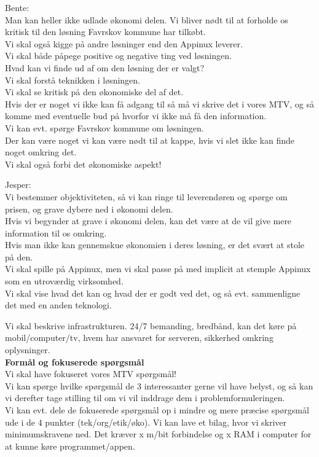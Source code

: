 Bente: \\ Man kan heller ikke udlade økonomi delen. Vi bliver nødt til at forholde os kritisk til den løsning Favrskov kommune har tilkøbt. \\ 
Vi skal også kigge på andre løsninger end den Appinux leverer.\\
Vi skal både påpege positive og negative ting ved løsningen.\\
Hvad kan vi finde ud af om den løsning der er valgt? \\
Vi skal forstå teknikken i løsningen. \\
Vi skal se kritisk på den økonomiske del af det. \\
Hvis der er noget vi ikke kan få adgang til så må vi skrive det i vores MTV, og så komme med eventuelle bud på hvorfor vi ikke må få den information.\\
Vi kan evt. spørge Favrskov kommune om løsningen.\\
Der kan være noget vi kan være nødt til at kappe, hvis vi slet ikke kan finde noget omkring det.\\
Vi skal også forbi det økonomiske aspekt!

Jesper: \\ Vi bestemmer objektiviteten, så vi kan ringe til leverendøren og spørge om prisen, og grave dybere ned i økonomi delen.\\
Hvis vi begynder at grave i økonomi delen, kan det være at de vil give mere information til os omkring.\\
Hvis man ikke kan gennemskue økonomien i deres løsning, er det svært at stole på den. \\
Vi skal spille på Appinux, men vi skal passe på med implicit at stemple Appinux som en utroværdig virksomhed. \\
Vi skal vise hvad det kan og hvad der er godt ved det, og så evt. sammenligne det med en anden teknologi.

Vi skal beskrive infrastrukturen. 24/7 bemanding, bredbånd, kan det køre på mobil/computer/tv, hvem har ansvaret for serveren, sikkerhed omkring oplysninger. \\

\textbf{Formål og fokuserede spørgsmål} 
\\
Vi skal have fokuseret vores MTV spørgsmål! \\
Vi kan spørge hvilke spørgsmål de 3 interessanter gerne vil have belyst, og så kan vi derefter tage stilling til om vi vil inddrage dem i problemformuleringen.\\
Vi kan evt. dele de fokuserede spørgsmål op i mindre og mere præcise spørgsmål ude i de 4 punkter (tek/org/etik/øko). Vi kan lave et bilag, hvor vi skriver minimumskravene ned. Det kræver x m/bit forbindelse og x RAM i computer for at kunne køre programmet/appen. \\

